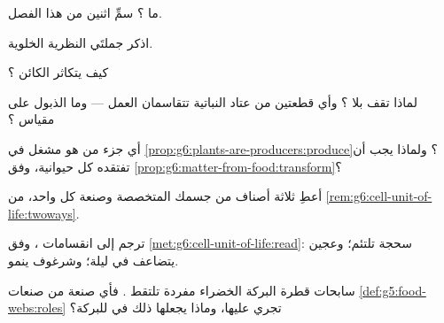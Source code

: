 \begin{exercise}[$\star$]\label{exo:g6:cell-unit-of-life:4}
ما  ؟ سمِّ اثنين من هذا الفصل.
\end{exercise}

\begin{exercise}[$\star$]\label{exo:g6:cell-unit-of-life:5}
اذكر جملتَي النظرية الخلوية.
\end{exercise}

\begin{exercise}[$\star$]\label{exo:g6:cell-unit-of-life:6}
كيف يتكاثر الكائن ؟
\end{exercise}

\begin{exercise}[$\star\star$]\label{exo:g6:cell-unit-of-life:7}
لماذا تقف  بلا ؟ وأي قطعتين من عتاد  النباتية
تتقاسمان العمل --- وما الذبول على مقياس ؟
\end{exercise}

\begin{exercise}[$\star\star$]\label{exo:g6:cell-unit-of-life:8}
أي جزء من  هو مشغل  في
\cref{prop:g6:plants-are-producers:produce}؟ ولماذا يجب أن تفتقده
كل  حيوانية، وفق
\cref{prop:g6:matter-from-food:transform}؟
\end{exercise}

\begin{exercise}[$\star\star$]\label{exo:g6:cell-unit-of-life:9}
أعطِ ثلاثة أصناف من  جسمك المتخصصة وصنعة كل واحد، من
\cref{rem:g6:cell-unit-of-life:twoways}.
\end{exercise}

\begin{exercise}[$\star\star$]\label{exo:g6:cell-unit-of-life:10}
ترجم إلى انقسامات ، وفق
\cref{met:g6:cell-unit-of-life:read}: سحجة تلتئم؛ وعجين يتضاعف في
ليلة؛ وشرغوف ينمو.
\end{exercise}

\begin{exercise}[$\star\star$]\label{exo:g6:cell-unit-of-life:11}
سابحات قطرة البركة الخضراء  مفردة تلتقط . فأي صنعة من
صنعات \cref{def:g5:food-webs:roles} تجري عليها، وماذا يجعلها ذلك
في  للبركة؟
\end{exercise}

